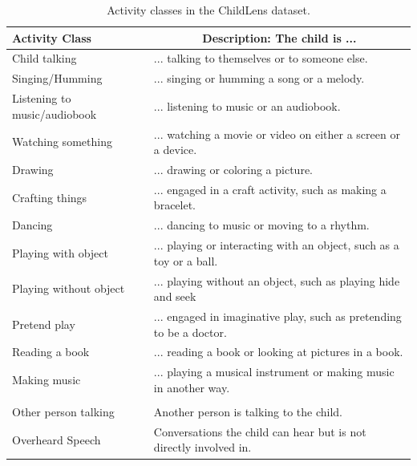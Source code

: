 \documentclass[
  man,floatsintext]{apa6}
\begin{document}
\begin{table}[tbp]

\begin{center}
\begin{threeparttable}

\caption{\label{tab:activity-classes-description}Activity classes in the ChildLens dataset.}

\begin{tabular}{ll}
\toprule
Activity Class & \multicolumn{1}{c}{Description: The child is ...}\\
\midrule
Child talking & ... talking to themselves or to someone else.\\
Singing/Humming & ... singing or humming a song or a melody.\\
Listening to music/audiobook & ... listening to music or an audiobook.\\
Watching something & ... watching a movie or video on either a screen or a device.\\
Drawing & ... drawing or coloring a picture.\\
Crafting things & ... engaged in a craft activity, such as making a bracelet.\\
Dancing & ... dancing to music or moving to a rhythm.\\
Playing with object & ... playing or interacting with an object, such as a toy or a ball.\\
Playing without object & ... playing without an object, such as playing hide and seek\\
Pretend play & ... engaged in imaginative play, such as pretending to be a doctor.\\
Reading a book & ... reading a book or looking at pictures in a book.\\
Making music & ... playing a musical instrument or making music in another way.\\
 & \\
Other person talking & Another person is talking to the child.\\
Overheard Speech & Conversations the child can hear but is not directly involved in.\\
\bottomrule
\end{tabular}

\end{threeparttable}
\end{center}

\end{table}
\end{document}
